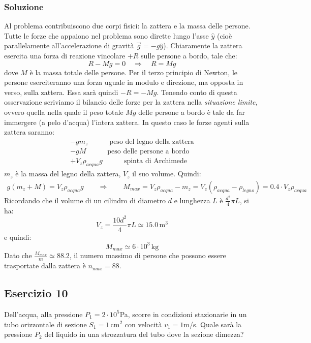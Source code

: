 \documentclass[12pt,a4paper]{book}
\begin{document}
\subsubsection*{Soluzione}
Al problema contribuiscono due corpi fisici: la zattera e la massa delle persone. Tutte le forze che appaiono nel problema sono dirette lungo l'asse $\hat{y}$ (cioè parallelamente all'accelerazione di gravità $\vec{g}=-g \hat{y}$).  Chiaramente la zattera esercita una forza di reazione vincolare $+R$ sulle persone a bordo, tale che: 
\begin{equation*}
R-Mg=0 \quad \Rightarrow \quad R=Mg
\end{equation*}
dove $M$ è la massa totale delle persone. Per il terzo principio di Newton, le persone eserciteranno
una forza uguale in modulo e direzione, ma opposta in verso, sulla zattera. Essa sarà quindi $-R=-Mg$. Tenendo conto di questa osservazione scriviamo il bilancio delle forze per la zattera nella \textit{situazione limite}, ovvero quella nella quale il peso totale $Mg$ delle persone a bordo è tale da far immergere (a pelo d'acqua) l'intera zattera. In questo caso le forze agenti sulla zattera saranno:
\begin{gather*}
-gm_{z}\qquad \quad \text{peso del legno della zattera} \\
-g M \qquad \quad \text{peso delle persone a bordo} \\
+V_z \rho_{acqua} g \qquad \quad \text{spinta di Archimede} 
\end{gather*}
$m_z$ è la massa del legno della zattera, $V_z$ il suo volume.  Quindi:
\begin{gather*}
g(m_{z}+M)=V_z \rho_{acqua} g \qquad \Rightarrow \qquad  M_{max}= V_z \rho_{acqua} - m_z = V_z (\rho_{acqua} - \rho_{legno})=0.4 \cdot V_z \rho_{acqua}
\end{gather*}
Ricordando che il volume di un cilindro di diametro $d$ e lunghezza $L$ è $\frac{d^2}{4} \pi L$, si ha:
\begin{equation*}
V_z=\frac{10 d^2}{4} \pi L \simeq 15.0 \, \text{m}^3
\end{equation*}
e quindi:
\begin{equation*}
M_{max} \simeq 6 \cdot 10^3 \, \text{kg}
\end{equation*}
Dato che $\frac{M_{max}}{m} \simeq 88.2$, il numero massimo di persone che possono essere trasportate dalla zattera è $n_{max}=88$. 

\subsection*{Esercizio 10}
Dell'acqua, alla pressione $P_1 =2\cdot 10^5$Pa, scorre in condizioni stazionarie in un tubo
orizzontale di sezione $S_1=1\,$cm$^2$ con velocità $v_1 = 1$m/s. Quale sarà la pressione $P_2$ del
liquido in una strozzatura del tubo dove la sezione dimezza?
\end{document}

